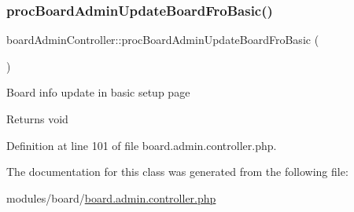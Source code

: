 \mbox{\label{classboardAdminController_a5bb01a312930634bf43e59dd9fef87e5}} 
\subsubsection{\texorpdfstring{proc\+Board\+Admin\+Update\+Board\+Fro\+Basic()}{procBoardAdminUpdateBoardFroBasic()}}
{\footnotesize\ttfamily board\+Admin\+Controller\+::proc\+Board\+Admin\+Update\+Board\+Fro\+Basic (\begin{DoxyParamCaption}{ }\end{DoxyParamCaption})}

Board info update in basic setup page \begin{DoxyReturn}{Returns}
void 
\end{DoxyReturn}


Definition at line 101 of file board.\+admin.\+controller.\+php.



The documentation for this class was generated from the following file\+:\begin{DoxyCompactItemize}
\item 
modules/board/\hyperlink{board_8admin_8controller_8php}{board.\+admin.\+controller.\+php}\end{DoxyCompactItemize}
